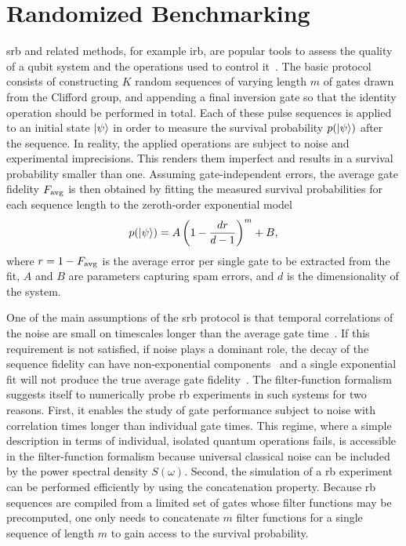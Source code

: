 \section{Randomized Benchmarking}\label{sec:ff:examples:randomized_benchmarking}
\Gls{srb} and related methods, for example \gls{irb}, are popular tools to assess the quality of a qubit system and the operations used to control it~\cite{Knill2008,Magesan2011,Magesan2012a}.
The basic protocol consists of constructing $K$ random sequences of varying length $m$ of gates drawn from the Clifford group,
and appending a final inversion gate so that the identity operation should be performed in total.
Each of these pulse sequences is applied to an initial state $\mbox{\ensuremath{\ket{\psi}}}$ in order to measure the survival probability $p(\mbox{\ensuremath{\ket{\psi}}})$ after the sequence.
In reality, the applied operations are subject to noise and experimental imprecisions.
This renders them imperfect and results in a survival probability smaller than one.
Assuming gate-independent errors, the average gate fidelity $F_{\mathrm{avg}}$ is then obtained by fitting the measured survival probabilities for each sequence length to the zeroth-order exponential model~\cite{Magesan2011}
\begin{equation}\label{eq:ff:SRB}
    p(\mbox{\ensuremath{\ket{\psi}}}) = A \left(1 - \frac{dr}{d-1}\right)^m + B,
\end{equation}
where $r = 1 - F_{\mathrm{avg}}$ is the average error per single gate to be extracted from the fit, $A$ and $B$ are parameters capturing \gls{spam} errors, and $d$ is the dimensionality of the system.

One of the main assumptions of the \gls{srb} protocol is that temporal correlations of the noise are small on timescales longer than the average gate time~\cite{Magesan2011}.
If this requirement is not satisfied, \eg if \oneoverf noise plays a dominant role, the decay of the sequence fidelity can have non-exponential components~\cite{Epstein2014,Fogarty2015,Feng2016} and a single exponential fit will not produce the true average gate fidelity~\cite{Mavadia2018,Edmunds2020}.
The filter-function formalism suggests itself to numerically probe \gls{rb} experiments in such systems for two reasons.
First, it enables the study of gate performance subject to noise with correlation times longer than individual gate times.
This regime, where a simple description in terms of individual, isolated quantum operations fails, is accessible in the filter-function formalism because universal classical noise can be included by the power spectral density $S(\omega)$.
Second, the simulation of a \gls{rb} experiment can be performed efficiently by using the concatenation property.
Because \gls{rb} sequences are compiled from a limited set of gates whose filter functions may be precomputed, one only needs to concatenate $m$ filter functions for a single sequence of length $m$ to gain access to the survival probability.


